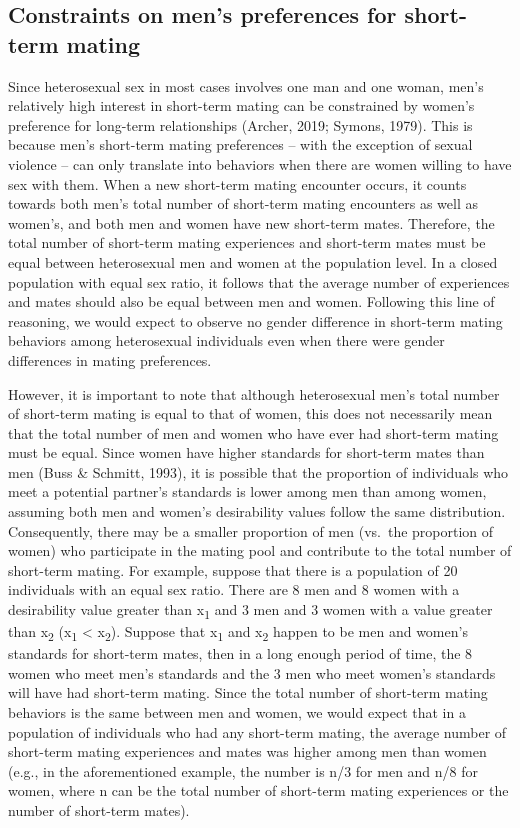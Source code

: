 \documentclass[
  11pt,
]{article}
\begin{document}
\hypertarget{constraints-on-mens-preferences-for-short-term-mating}{%
\subsection{Constraints on men's preferences for short-term
mating}\label{constraints-on-mens-preferences-for-short-term-mating}}

Since heterosexual sex in most cases involves one man and one woman,
men's relatively high interest in short-term mating can be constrained
by women's preference for long-term relationships (Archer, 2019; Symons,
1979). This is because men's short-term mating preferences -- with the
exception of sexual violence -- can only translate into behaviors when
there are women willing to have sex with them. When a new short-term
mating encounter occurs, it counts towards both men's total number of
short-term mating encounters as well as women's, and both men and women
have new short-term mates. Therefore, the total number of short-term
mating experiences and short-term mates must be equal between
heterosexual men and women at the population level. In a closed
population with equal sex ratio, it follows that the average number of
experiences and mates should also be equal between men and women.
Following this line of reasoning, we would expect to observe no gender
difference in short-term mating behaviors among heterosexual individuals
even when there were gender differences in mating preferences.

However, it is important to note that although heterosexual men's total
number of short-term mating is equal to that of women, this does not
necessarily mean that the total number of men and women who have ever
had short-term mating must be equal. Since women have higher standards
for short-term mates than men (Buss \& Schmitt, 1993), it is possible
that the proportion of individuals who meet a potential partner's
standards is lower among men than among women, assuming both men and
women's desirability values follow the same distribution. Consequently,
there may be a smaller proportion of men (vs.~the proportion of women)
who participate in the mating pool and contribute to the total number of
short-term mating. For example, suppose that there is a population of 20
individuals with an equal sex ratio. There are 8 men and 8 women with a
desirability value greater than x\textsubscript{1} and 3 men and 3 women
with a value greater than x\textsubscript{2} (x\textsubscript{1}
\textless{} x\textsubscript{2}). Suppose that x\textsubscript{1} and
x\textsubscript{2} happen to be men and women's standards for short-term
mates, then in a long enough period of time, the 8 women who meet men's
standards and the 3 men who meet women's standards will have had
short-term mating. Since the total number of short-term mating behaviors
is the same between men and women, we would expect that in a population
of individuals who had any short-term mating, the average number of
short-term mating experiences and mates was higher among men than women
(e.g., in the aforementioned example, the number is n/3 for men and n/8
for women, where n can be the total number of short-term mating
experiences or the number of short-term mates).
\end{document}
